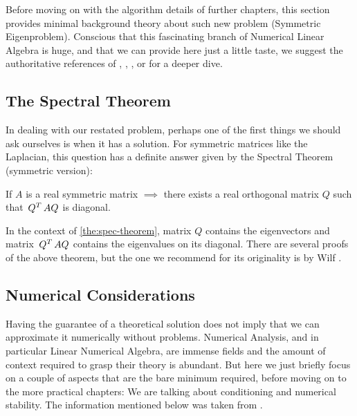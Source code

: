 Before moving on with the algorithm
details of further chapters, this section provides minimal background
theory about such new problem (Symmetric Eigenproblem). Conscious
that this fascinating branch of 
Numerical Linear Algebra is huge, and that we can provide here just a
little taste, we suggest the authoritative references of
\cite{parlett80}, \cite{saad92}, \cite{cullum02}, \cite{demmel97} or
\cite{bai00} for a deeper dive. 

\subsection{The Spectral Theorem}

In dealing with our restated problem, perhaps one of the first things
we should ask ourselves is when it has a solution. For symmetric
matrices like the \gls{Laplacian}, this question has a definite answer given
by the Spectral Theorem (symmetric version):

\begin{theorem}
\label{the:spec-theorem}
If $A$ is a real symmetric matrix $\implies$ there exists a real orthogonal matrix $Q$ such that $\,{Q}^{T}\,AQ$ is diagonal. 
\end{theorem}
\joinbelow{1cm}

In the context of \cref{the:spec-theorem}, matrix $Q$ contains the
eigenvectors and matrix $\,{Q}^{T}\,AQ$ contains the eigenvalues on its
diagonal. There are several proofs of the above theorem, but the one we
recommend for its originality is by Wilf \cite{wilf81}.

\subsection{Numerical Considerations}

Having the guarantee of a theoretical solution does not imply that we
can approximate it numerically without problems. Numerical Analysis,
and in particular Linear Numerical 
Algebra, are immense fields and the amount of context required to grasp
their theory is abundant. But here we just briefly focus on a couple of
aspects that are the bare minimum required, before moving on to the more
practical chapters: We are talking about conditioning and numerical
stability. The information mentioned below was taken from
\cite{bindel09}. \\ 

